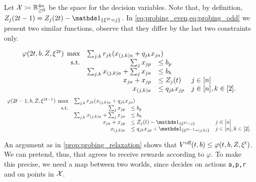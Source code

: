 \documentclass[letterpaper,11pt]{article}
\begin{document}
Let $\mathcal{X}\coloneqq\mathbb{R}_{\geq 0}^{4n}$ be the space for the decision variables.
Note that, by definition, $Z_j(2t-1)=Z_j(2t)-\In{\xi^{2t}=j}$.
In \cref{eq:probing_even,eq:probing_odd} we present two similar functions, observe that they differ by the last two constraints only.

\begin{equation}\label{eq:probing_even}
\begin{array}{rrll}
\varphi(2t,b,Z,\xi^{2t}) \; \max & \multicolumn{3}{l}{\sum_{j,k}r_{jk}(x_{(j,k)a}+q_{jk}x_{ja})} \\
\text{s.t.}& \sum_j x_{jp} & \leq b_p \\
& \sum_{j,k}x_{(j,k)a}+\sum_jx_{ja} &\leq b_h \\
&  x_{ja} +x_{jp} & \leq Z_j(t)  & j\in [n] \\
& x_{(j,k)a} &\leq q_{jk}x_{jp} &  j \in [n],k\in [2].
\end{array}
\end{equation}
\begin{equation}\label{eq:probing_odd}
\begin{array}{rrll}
\varphi(2t-1,b,Z,\xi^{2t-1}) \; \max & \multicolumn{3}{l}{\sum_{j,k}r_{jk}(x_{(j,k)a}+q_{jk}x_{ja})} \\
\text{s.t.}& \sum_j x_{jp} & \leq b_p \\
& \sum_{j,k}x_{(j,k)a}+\sum_jx_{ja} &\leq b_h \\
&  x_{ja} + x_{jp} & \leq Z_j(t)-\In{\xi^{2t}=j}  & j\in [n] \\
& x_{(j,k)a} &\leq q_{jk}x_{jp} + \In{\xi^{2t-1}=(j,k)}&  j \in [n],k\in [2].
\end{array}
\end{equation}

An argument as in \cref{prop:probing_relaxation} shows that $V^{\text{off}}(t,b)\leq \varphi(t,b,Z,\xi^t)$.
We can pretend, thus, that \off agrees to receive rewards according to $\varphi$.
To make this precise, we need a map between two worlds, since \onl decides on actions \texttt{a,p,r} and \off on points in $\mathcal{X}$.
\end{document}
